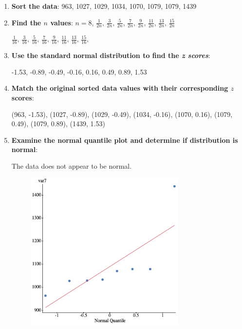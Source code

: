 \documentclass[12pt,fleqn]{article}
\begin{document}
\begin{enumerate}
\item \textbf{Sort the data}: 963, 1027, 1029, 1034, 1070, 1079, 1079, 1439

\item \textbf{Find the $n$ values}:
$n = 8$,
  $\frac{1}{2n} \text{, }
  \frac{3}{2n} \text{, }
  \frac{5}{2n} \text{, }
  \frac{7}{2n} \text{, }
  \frac{9}{2n} \text{, }
  \frac{11}{2n} \text{, }
  \frac{13}{2n} \text{, }
  \frac{15}{2n}$

  $\frac{1}{16} \text{, }
  \frac{3}{16} \text{, }
  \frac{5}{16} \text{, }
  \frac{7}{16} \text{, }
  \frac{9}{16} \text{, }
  \frac{11}{16} \text{, }
  \frac{13}{16} \text{, }
  \frac{15}{16} \text{, } $

\item \textbf{Use the standard normal distribution to find the \textit{z scores}}:

-1.53, -0.89, -0.49, -0.16, 0.16, 0.49, 0.89, 1.53

\item \textbf{Match the original sorted data values with their corresponding $z$ scores}:

(963, -1.53), (1027, -0.89), (1029, -0.49), (1034, -0.16), (1070, 0.16), (1079, 0.49), (1079, 0.89), (1439, 1.53)

\item \textbf{Examine the normal quantile plot and determine if distribution is normal}:

The data does not appear to be normal.
\begin{figure}[ht]
  \centering
  \includegraphics[width=8cm]{assets/brains.png}
\end{figure}
\end{enumerate}
\end{document}

